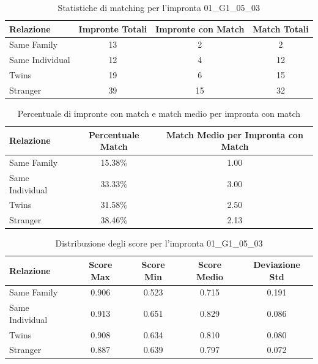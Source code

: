 \begin{table}[htbp]
\centering
\caption{Statistiche di matching per l'impronta 01\_G1\_05\_03}
\label{tab:results_01_G1_05_03}
\begin{tabular}{|l|c|c|c|}
\hline
\textbf{Relazione} & \textbf{Impronte Totali} & \textbf{Impronte con Match} & \textbf{Match Totali} \\
\hline
Same Family & 13 & 2 & 2 \\
\hline
Same Individual & 12 & 4 & 12 \\
\hline
Twins & 19 & 6 & 15 \\
\hline
Stranger & 39 & 15 & 32 \\
\hline
\end{tabular}
\end{table}


\begin{table}[htbp]
\centering
\caption{Percentuale di impronte con match e match medio per impronta con match}
\label{tab:match_percentage_01_G1_05_03}
\begin{tabular}{|l|c|c|}
\hline
\textbf{Relazione} & \textbf{Percentuale Match} & \textbf{Match Medio per Impronta con Match} \\
\hline
Same Family & 15.38\% & 1.00 \\
\hline
Same Individual & 33.33\% & 3.00 \\
\hline
Twins & 31.58\% & 2.50 \\
\hline
Stranger & 38.46\% & 2.13 \\
\hline
\end{tabular}
\end{table}


\begin{table}[htbp]
\centering
\caption{Distribuzione degli score per l'impronta 01\_G1\_05\_03}
\label{tab:scores_01_G1_05_03}
\begin{tabular}{|l|c|c|c|c|}
\hline
\textbf{Relazione} & \textbf{Score Max} & \textbf{Score Min} & \textbf{Score Medio} & \textbf{Deviazione Std} \\
\hline
Same Family & 0.906 & 0.523 & 0.715 & 0.191 \\
\hline
Same Individual & 0.913 & 0.651 & 0.829 & 0.086 \\
\hline
Twins & 0.908 & 0.634 & 0.810 & 0.080 \\
\hline
Stranger & 0.887 & 0.639 & 0.797 & 0.072 \\
\hline
\end{tabular}
\end{table}

